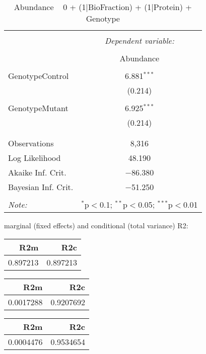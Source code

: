 \documentclass[11pt]{report}
\begin{document}
\begin{table}[!htbp] \centering 
  \caption{Abundance ~ 0 + (1|BioFraction) + (1|Protein) + Genotype} 
  \label{} 
\begin{tabular}{@{\extracolsep{5pt}}lc} 
\\[-1.8ex]\hline 
\hline \\[-1.8ex] 
 & \multicolumn{1}{c}{\textit{Dependent variable:}} \\ 
\cline{2-2} 
\\[-1.8ex] & Abundance \\ 
\hline \\[-1.8ex] 
 GenotypeControl & 6.881$^{***}$ \\ 
  & (0.214) \\ 
  & \\ 
 GenotypeMutant & 6.925$^{***}$ \\ 
  & (0.214) \\ 
  & \\ 
\hline \\[-1.8ex] 
Observations & 8,316 \\ 
Log Likelihood & 48.190 \\ 
Akaike Inf. Crit. & $-$86.380 \\ 
Bayesian Inf. Crit. & $-$51.250 \\ 
\hline 
\hline \\[-1.8ex] 
\textit{Note:}  & \multicolumn{1}{r}{$^{*}$p$<$0.1; $^{**}$p$<$0.05; $^{***}$p$<$0.01} \\ 
\end{tabular} 
\end{table} 
marginal (fixed effects) and conditional (total variance) R2:

\begin{tabular}{r|r}
\hline
R2m & R2c\\
\hline
0.897213 & 0.897213\\
\hline
\end{tabular}

\begin{tabular}{r|r}
\hline
R2m & R2c\\
\hline
0.0017288 & 0.9207692\\
\hline
\end{tabular}

\begin{tabular}{r|r}
\hline
R2m & R2c\\
\hline
0.0004476 & 0.9534654\\
\hline
\end{tabular}
\end{document}

